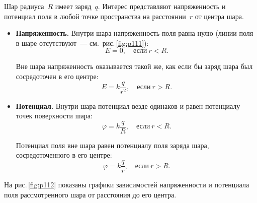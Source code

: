 \documentclass[main.tex]{subfiles}
\begin{document}
Шар радиуса~$R$ имеет заряд~$q$. Интерес представляют напряженность и потенциал поля в любой точке пространства на расстоянии~$r$ от центра шара. 
\begin{itemize}
    \item \textbf{Напряженность.} Внутри шара напряженность поля равна нулю (линии поля в шаре отсутствуют~--- см.~рис.\,\ref{fig:p111}):
    \begin{equation}
    \label{13esphere_e1}
    E=0,\quad \text{если}\ r<R.
    \end{equation}

    Вне шара напряженность оказывается такой же, как если бы заряд шара был сосредоточен в его центре:
    \begin{equation}
    \label{13esphere_e2}
    E=k\frac{q}{r^2},\quad \text{если}\ r>R.
    \end{equation}

    \item \textbf{Потенциал.} Внутри шара потенциал везде одинаков и равен потенциалу точек поверхности шара:
    \begin{equation}
    \label{13esphere_e3}
        \varphi=k\frac{q}{R},\quad \text{если}\ r<R.
    \end{equation}

    Потенциал поля вне шара равен потенциалу поля заряда шара, сосредоточенного в его центре:
    \begin{equation}
    \label{13esphere_e4}
        \varphi=k\frac{q}{r},\quad \text{если}\ r>R.
    \end{equation}
    
\end{itemize}

На рис.\,\ref{fig:p112} показаны графики зависимостей напряженности и потенциала поля рассмотренного шара от расстояния до его центра.  
\end{document}
